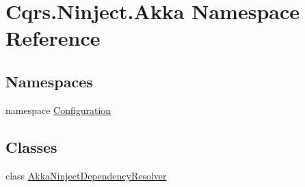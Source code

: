 \hypertarget{namespaceCqrs_1_1Ninject_1_1Akka}{}\section{Cqrs.\+Ninject.\+Akka Namespace Reference}
\label{namespaceCqrs_1_1Ninject_1_1Akka}
\subsection*{Namespaces}
\begin{DoxyCompactItemize}
\item 
namespace \hyperlink{namespaceCqrs_1_1Ninject_1_1Akka_1_1Configuration}{Configuration}
\end{DoxyCompactItemize}
\subsection*{Classes}
\begin{DoxyCompactItemize}
\item 
class \hyperlink{classCqrs_1_1Ninject_1_1Akka_1_1AkkaNinjectDependencyResolver}{Akka\+Ninject\+Dependency\+Resolver}
\end{DoxyCompactItemize}
